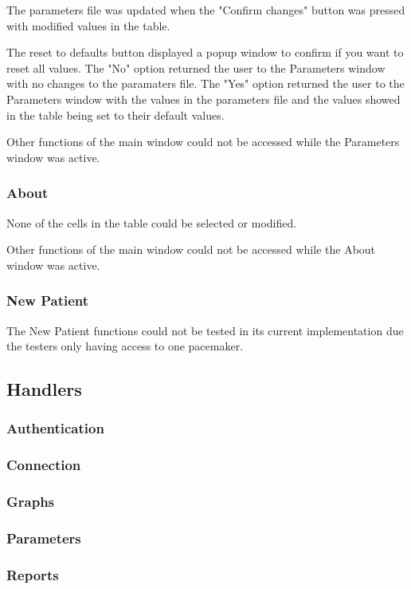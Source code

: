 \documentclass[12pt]{article}
\begin{document}
The parameters file was updated when the "Confirm changes" button was pressed with modified values in the table. 

The reset to defaults button displayed a popup window to confirm if you want to reset all values. The "No" option returned the user to the Parameters window with no changes to the paramaters file. The "Yes" option returned the user to the Parameters window with the values in the parameters file and the values showed in the table being set to their default values. 

Other functions of the main window could not be accessed while the Parameters window was active.

\subsubsection{About}
None of the cells in the table could be selected or modified.

Other functions of the main window could not be accessed while the About window was active.

\subsubsection{New Patient}
The New Patient functions could not be tested in its current implementation due the testers only having access to one pacemaker.

\subsection{Handlers}

\subsubsection{Authentication}
\subsubsection{Connection}
\subsubsection{Graphs}
\subsubsection{Parameters}
\subsubsection{Reports}
\end{document}
